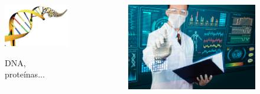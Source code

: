 {
	
	\begin{frame}{}
		\kern-5mm
		\begin{columns}[c]
			\begin{figure}[H]
				\centering
				\includegraphics[width=\textwidth]{./Images/dna.jpg}
				
				\small DNA, proteínas...
			\end{figure}

			\begin{figure}[H]
				\centering
				\includegraphics[width=\textwidth]{./Images/health-data-analysis.jpg}
				

\end{figure}
\end{columns}
\end{frame}}
